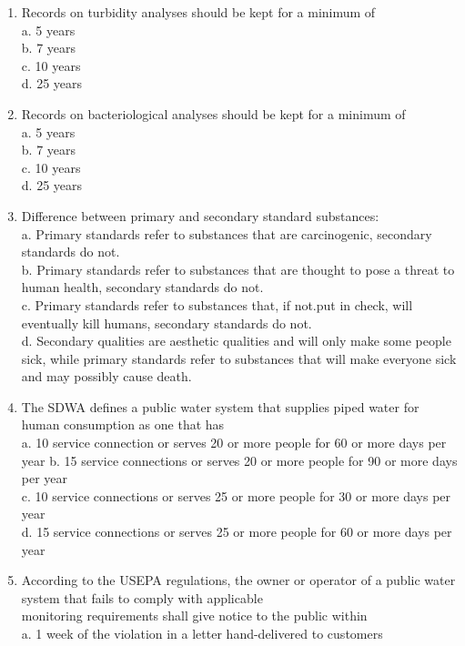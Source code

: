 \begin{enumerate}
\item Records on turbidity analyses should be kept for a minimum of\\
a. 5 years\\
b. 7 years\\
c. 10 years\\
d. 25 years\\
\item Records on bacteriological analyses should be kept for a minimum of\\
a. 5 years\\
b. 7 years\\
c. 10 years\\
d. 25 years\\
\item Difference between primary and secondary standard substances:\\
a. Primary standards refer to substances that are carcinogenic, secondary standards do not.\\
b. Primary standards refer to substances that are thought to pose a threat to human health, secondary standards do not.\\
c. Primary standards refer to substances that, if not.put in check, will eventually kill humans, secondary standards do not.\\
d. Secondary qualities are aesthetic qualities and will only make some people sick, while primary standards refer to substances that will make everyone sick and may possibly cause death.\\
\item The SDWA defines a public water system that supplies piped water for human consumption as one that has\\
a. 10 service connection or serves 20 or more people for 60 or more days per year b. 15 service connections or serves 20 or more people for 90 or more days per year\\
c. 10 service connections or serves 25 or more people for 30 or more days per year\\
d. 15 service connections or serves 25 or more people for 60 or more days per year\\
\item According to the USEPA regulations, the owner or operator of a public water system that fails to comply with applicable\\
monitoring requirements shall give notice to the public within\\
a. 1 week of the violation in a letter hand-delivered to customers\\

\end{enumerate}
